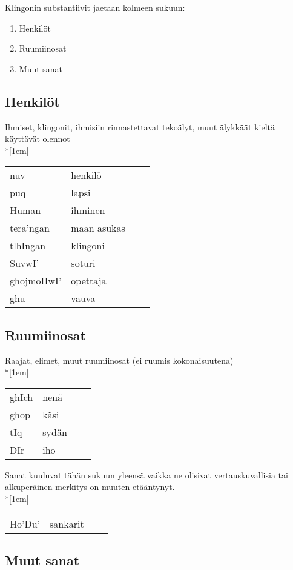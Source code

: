\documentclass{book}
\begin{document}
Klingonin substantiivit jaetaan kolmeen sukuun:

\begin{enumerate}
\item Henkilöt
\item Ruumiinosat
\item Muut sanat
\end{enumerate}

\subsection{Henkilöt}

Ihmiset, klingonit, ihmisiin rinnastettavat tekoälyt, muut älykkäät kieltä käyttävät olennot\\*[1em]
\begin{tabular}{Bl Il}
nuv & henkilö \\
puq & lapsi \\
Human & ihminen \\
tera'ngan & maan asukas \\
tlhIngan & klingoni \\
SuvwI' & soturi \\
ghojmoHwI' & opettaja \\
ghu & vauva \\
\end{tabular}

\subsection{Ruumiinosat}

Raajat, elimet, muut ruumiinosat (ei ruumis kokonaisuutena)\\*[1em]
\begin{tabular}{Bl Il}
ghIch & nenä \\
ghop & käsi \\
tIq & sydän \\
DIr & iho \\
\end{tabular}

Sanat kuuluvat tähän sukuun yleensä vaikka ne olisivat vertauskuvallisia tai alkuperäinen merkitys on muuten etääntynyt.\\*[1em]
\begin{tabular}{Bl Il}
    Ho'Du' & sankarit \\
\end{tabular}

\subsection{Muut sanat}
\end{document}

